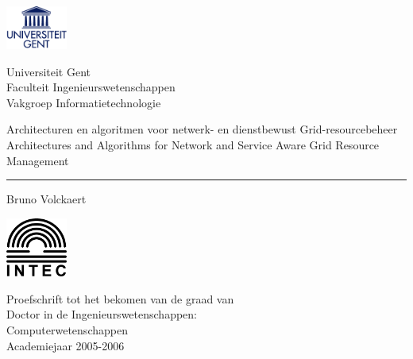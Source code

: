 \documentclass[10pt,a4paper,twoside,dutch,english]{book}                %
\begin{document}
\graphicspath{{fig/}}

% 
 \thispagestyle{empty}   %
% 
 \noindent
 \begin{minipage}{3cm}%
   \includegraphics*[width=2cm]{UGentlogo}%
 \end{minipage}\hfill
 \begin{minipage}{8cm}
 \raggedleft
 \textsf{Universiteit Gent\\
 Faculteit Ingenieurswetenschappen\\
 Vakgroep Informatietechnologie}
 \end{minipage}
% 
\bigskip
   \begin{flushleft}
     \Large \textsf{Architecturen en algoritmen voor netwerk- en dienstbewust Grid-resourcebeheer}\\
     \vspace{0.1in}\large{\textsf{Architectures and Algorithms for Network and Service Aware Grid Resource Management}}%
   \end{flushleft}
 \hrule
% 
 \bigskip
   \LARGE\noindent \textsf{Bruno Volckaert} \hfill
 \bigskip
% 
% 
 \normalsize
% 
 \vfill
 \begin{minipage}{2.0cm}%
     \includegraphics*[width=2.0cm]{intec}%
 \end{minipage}\hfill
 \begin{minipage}{9cm}
 \raggedleft
 \textsf{Proefschrift tot het bekomen van de graad van \\
 Doctor in de Ingenieurswetenschappen: \\
 Computerwetenschappen \\
 Academiejaar 2005-2006}
 \end{minipage}
\end{document}
